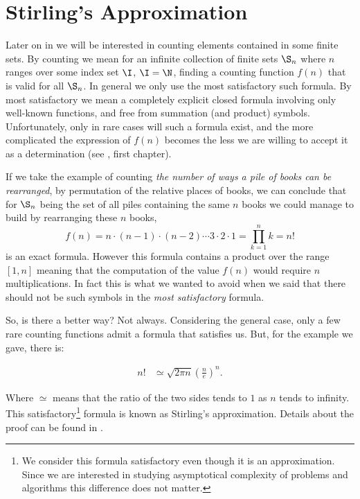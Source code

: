\section{Stirling's Approximation}
\label{tree:sorting:stirling}

Later on in  we will be interested in counting elements
contained in some
finite sets. By counting we mean for an infinite collection of finite sets
$\S_n$ where $n$ ranges over some index set $\I$, \eg $\I = \N$, finding a
counting function $f(n)$ that is valid for all $\S_n$. In general we only
use the most satisfactory such formula. By most satisfactory we mean a
completely explicit closed formula involving only well-known functions, and
free from summation (and product) symbols. Unfortunately, only in rare cases
will such a formula exist, and the more complicated the expression of $f(n)$
becomes the less we are willing to accept it as a determination
(see \citet*{Stanley:2011:ECV:2124415}, first chapter).

If we take the example of counting \emph{the number of ways a pile of books can
be rearranged}, \ie by permutation of the relative places of books, we can
conclude that for $\S_n$ being the set of all piles containing the same $n$
books we could manage to build by rearranging these $n$ books,
\begin{displaymath}
f(n) = n \cdot (n-1) \cdot (n-2) \cdots 3 \cdot 2 \cdot 1 = \prod_{k=1}^n k = n!
\end{displaymath}
is an exact formula. However this formula contains a product over the range
$[1, n]$ meaning that the computation of the value $f(n)$ would require $n$
multiplications. In fact this is what we wanted to avoid when we said that
there should not be such symbols in the \emph{most satisfactory} formula.

So, is there a better way? Not always. Considering the general case, only a few
rare counting functions admit a formula that satisfies us. But, for
the example we gave, there is:
\begin{theorem}
\label{tree:sorting:theorem/stirling}
\begin{align*}
n! &\simeq \sqrt{2 \pi n} \left(\frac{n}{e}\right)^n.
\end{align*}
\end{theorem}
Where \(\simeq\) means that the ratio of the two sides tends to \(1\) as \(n\)
tends to infinity.
This satisfactory\footnote{We consider this formula satisfactory even though it is
an approximation. Since we are interested in studying asymptotical complexity
of problems and algorithms this difference does not matter.} formula is known as Stirling's approximation. Details
about the proof can be found in \citet*{feller1967direct}.

